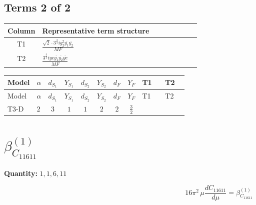 \documentclass[8pt]{article}
\begin{document}
\begin{landscape}
\subsection*{Terms 2 of 2}
\begin{center}
\begin{tabular}{@{}c >{\raggedright\arraybackslash}p{0.82\linewidth}@{}}
\toprule
Column & Representative term structure \\
\midrule
T1 & \(\displaystyle \frac{\sqrt{2} \cdot 3^{\frac{3}{4}} i g_{2}^{2} \overline{y_{1}} \overline{y_{2}}}{MF}\) \\
\midrule
T2 & \(\displaystyle \frac{3^{\frac{3}{4}} i ye \overline{y_{1}} \overline{y_{2}} \overline{ye}}{MF}\) \\
\midrule
\bottomrule
\end{tabular}
\end{center}
\smallskip
\tiny
\begin{longtable}{@{}llcccccc >{\raggedright\arraybackslash}p{0.21\linewidth} >{\raggedright\arraybackslash}p{0.21\linewidth}@{}}
\toprule
Model & $\alpha$ & $d_{S_1}$ & $Y_{S_1}$ & $d_{S_2}$ & $Y_{S_2}$ & $d_F$ & $Y_F$ & T1 & T2 \\
\midrule
\endfirsthead
\toprule
Model & $\alpha$ & $d_{S_1}$ & $Y_{S_1}$ & $d_{S_2}$ & $Y_{S_2}$ & $d_F$ & $Y_F$ & T1 & T2 \\
\midrule
\endhead
T3-D & $2$ & $3$ & $1$ & $1$ & $2$ & $2$ & $\frac{3}{2}$ & \scriptsize\adjustbox{max width=\linewidth}{$\begin{gathered} - \frac{\sqrt{2} \cdot 3^{\frac{3}{4}} i g_{2}^{2} \overline{y_{1}} \overline{y_{2}}}{3 MF}\end{gathered}$} & \scriptsize\adjustbox{max width=\linewidth}{$\begin{gathered} \frac{3^{\frac{3}{4}} i ye \overline{y_{1}} \overline{y_{2}} \overline{ye}}{12 MF}\end{gathered}$} \\
\midrule
\bottomrule
\end{longtable}
\clearpage
\section*{$\beta_{C_{11611}}^{(1)}$}
\noindent\textbf{Quantity: }$\mathrm{1,1,6,11}$\par\smallskip
\[16\pi^2\,\mu\frac{d C_{11611}}{d\mu}=\beta_{C_{11611}}^{(1)}\]

\end{landscape}
\end{document}
